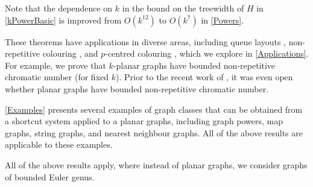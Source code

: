 \documentclass{patmorin}
\renewcommand{\geq}{\geqslant}
\begin{document}
Note that the dependence on $k$ in the bound on the treewidth of $H$ in \cref{kPowerBasic} is improved from $O(k^{12})$ to $O(k^7)$ in \cref{Powers}. 


These theorems have applications in diverse areas, including queue layouts  \citep{dujmovic.joret.ea:planar}, non-repetitive colouring  \citep{dujmovic.esperet.ea:planar}, and $p$-centred colouring  \citep{micek:personal}, 
which we explore in \cref{Applications}. For example, we prove that $k$-planar graphs have bounded non-repetitive chromatic number (for fixed $k$). Prior to the recent work of \citet{dujmovic.esperet.ea:planar}, it was even open whether planar graphs have bounded non-repetitive chromatic number.


\cref{Examples} presents several examples of graph classes that can be obtained from a shortcut system applied to a planar graphs, including graph powers, map graphs, string graphs, and nearest neighbour graphs. All of the above results are applicable to these examples. 

All of the above results apply, where instead of planar graphs, we consider graphs of bounded Euler genus. 

%
\end{document}
